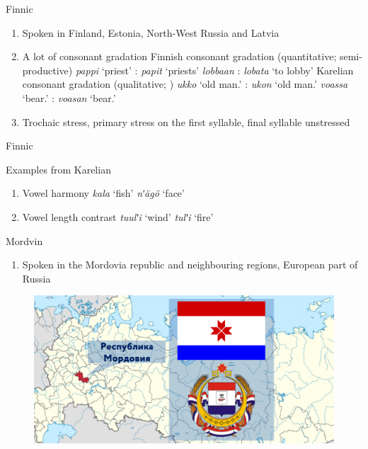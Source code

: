 \documentclass[10 pt, handout]{beamer}
\begin{document}
\begin{frame}{Finnic}

	\begin{enumerate}[$\gg$]
		\item Spoken in Finland, Estonia, North-West Russia and Latvia
		\item A lot of consonant gradation
			\pex Finnish consonant gradation (quantitative; semi-productive)
				\a \emph{pappi} `priest' : \emph{papit} `priests'
				\a \emph{lobbaan} : \emph{lobata} `to lobby'
			\xe
			\pex Karelian consonant gradation (qualitative; \cite{})
				\a \emph{ukko} `old man.{\Nom}' : \emph{ukon} `old man.{\Gen}'
				\a \emph{voassa} `bear.{\Nom}' : \emph{voasan} `bear.{\Gen}'
			\xe
		\item Trochaic stress, primary stress on the first syllable, final syllable unstressed
	\end{enumerate}

\end{frame}

\begin{frame}{Finnic}

	Examples from Karelian \parencite{ryagoev1993}
	\begin{enumerate}[$\gg$]
		\item Vowel harmony
			\pex 
				\a \emph{kala} \hfill `fish'
				\a \emph{nʹ{\"a}g{\"o}} \hfill `face'
			\xe
		\item Vowel length contrast
			\pex
				\a \emph{tuulʹi} \hfill `wind'
				\a \emph{tulʹi} \hfill `fire'
			\xe
	\end{enumerate}

\end{frame}

\begin{frame}{Mordvin}

	\begin{enumerate}[$\gg$]
		\item Spoken in the Mordovia republic and neighbouring regions, European part of Russia
	\end{enumerate}

	\begin{figure}[H]
		\centering
		\includegraphics[scale=.4]{mordovia-map}
	\end{figure}

\end{frame}
\end{document}
